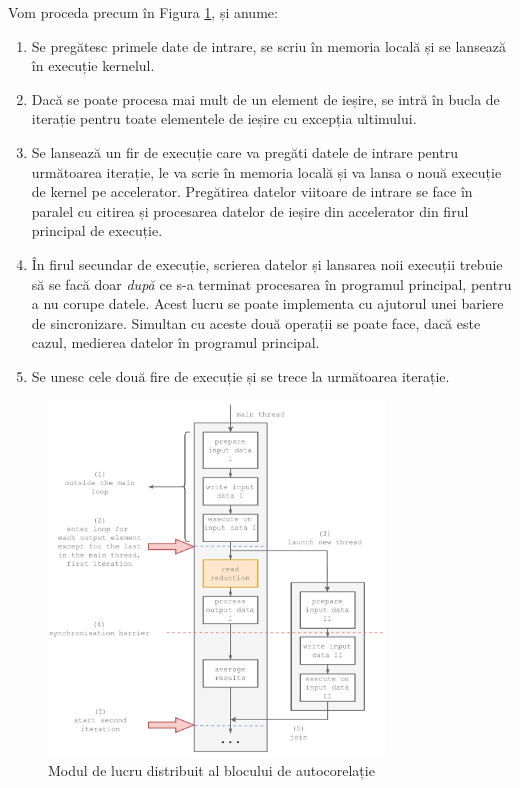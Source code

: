 Vom proceda precum în Figura \ref{fig:autocorr-parallel}, și anume:
\begin{enumerate}
  \item Se pregătesc primele date de intrare, se scriu în memoria locală și se
  lansează în execuție kernelul.

  \item Dacă se poate procesa mai mult de un element de ieșire, se intră în
  bucla de iterație pentru toate elementele de ieșire cu excepția ultimului.

  \item Se lansează un fir de execuție care va pregăti datele de intrare pentru
  următoarea iterație, le va scrie în memoria locală și va lansa o nouă execuție
  de kernel pe accelerator. Pregătirea datelor viitoare de intrare se face în
  paralel cu citirea și procesarea datelor de ieșire din accelerator din
  firul principal de execuție.

  \item În firul secundar de execuție, scrierea datelor și lansarea noii
  execuții trebuie să se facă doar \textit{după} ce s-a terminat procesarea în
  programul principal, pentru a nu corupe datele. Acest lucru se poate
  implementa cu ajutorul unei bariere de sincronizare. Simultan cu aceste două
  operații se poate face, dacă este cazul, medierea datelor în programul
  principal.

  \item Se unesc cele două fire de execuție și se trece la următoarea iterație.
\end{enumerate}

\begin{figure}[h]
    \centering
    \includegraphics[width=0.8\textwidth]{src/img/autocorr-parallel}
    \caption{Modul de lucru distribuit al blocului de autocorelație}
    \label{fig:autocorr-parallel}
\end{figure}

